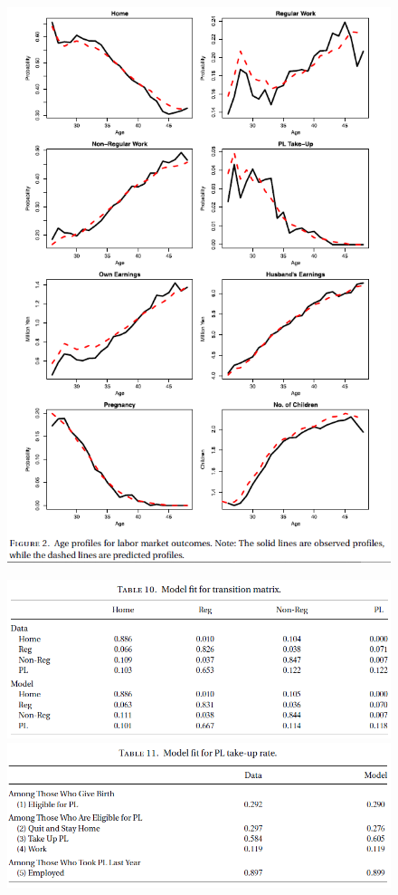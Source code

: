 \documentclass[../root]{subfiles}
\begin{document}
    \begin{figure}[h]
      \centering
      \includegraphics[scale = 1]{0619tanji/F2}
      \label{F2}
    \end{figure}

    \begin{figure}[h]
      \centering
      \includegraphics[scale = 1]{0619tanji/T10}
      \includegraphics[scale = 1]{0619tanji/T11}
      \label{T1011}
    \end{figure}
\end{document}
